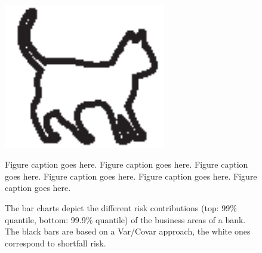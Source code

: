 \begin{figure}[htb]
\includegraphics[width=200pt, height=200pt]{figs/cat.eps}
\caption[Short figure caption]{Figure caption goes here. Figure caption goes here.
Figure caption goes here. Figure caption goes here. Figure caption goes here.
Figure caption goes here.}
\end{figure}





\begin{figure}
\begin{center}
\end{center}
\caption[The bar charts depict the different risk contributions]{The bar charts depict the different risk contributions (top: 99\% quantile, bottom: 99.9\% quantile) of the business areas of a bank. The black bars
are based on a Var/Covar approach, the white ones correspond to shortfall risk.}
\end{figure}

